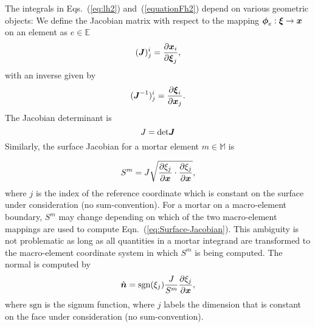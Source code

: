 The integrals in Eqs.~(\ref{eq:lh2}) and~(\ref{equationFh2}) depend on various geometric objects:
We define the Jacobian matrix with respect to the mapping $\boldsymbol{\phi}_e: \boldsymbol{\xi} \rightarrow \boldsymbol{x}$ on an element as $e \in \mathbb{E}$
%
 \begin{equation}
    (\boldsymbol{J})^i_j = \frac{\partial \boldsymbol{x}_i}{\partial \boldsymbol{\xi}_j},
 \end{equation}
%
with an inverse given by
%
 \begin{equation}
    (\boldsymbol{J}^{-1})^i_j = \frac{\partial \boldsymbol{\xi}_i}{\partial \boldsymbol{x}_j}.
 \end{equation}
%
The Jacobian determinant is
%
 \begin{equation}\label{eq:Jacobian}
   J = \text{det}\boldsymbol{J}
 \end{equation}
%
 Similarly, the surface Jacobian for a mortar element $m \in \mathbb{M}$ is

 \begin{equation}\label{eq:Surface-Jacobian}
   S^m = J\sqrt{\frac{\partial \xi_j}{\partial \boldsymbol{x}} \cdot \frac{\partial \xi_j}{\partial \boldsymbol{x}}},
 \end{equation}
 where $j$ is the index of the reference coordinate which is constant on the surface under consideration (no sum-convention).
 For a mortar on a macro-element boundary, $S^m$ may change depending on which of the two macro-element mappings are used to compute Eqn.~(\ref{eq:Surface-Jacobian}). This ambiguity is not problematic as long as all quantities in a mortar integrand are transformed to the macro-element coordinate system in which $S^m$ is being computed.
The normal is computed by
\begin{equation}
 \Hat{\boldsymbol{n}} = \text{sgn}(\xi_j)\frac{J}{S^m}\frac{\partial \xi_j}{\partial \boldsymbol{x}},
\end{equation}
%
where $\text{sgn}$ is the signum function, where $j$ labels the dimension that is constant on the face under consideration (no sum-convention).
 
